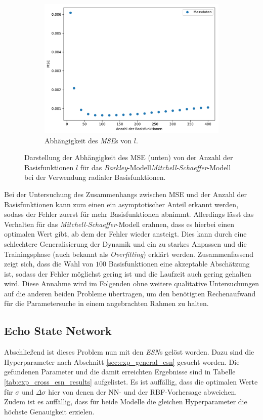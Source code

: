 \begin{figure}[h]
	\centering
	\begin{subfigure}{\textwidth}
		\centering
		\includegraphics[width=4.2in]{figures/results/cross_prediction/rbf_placements_uv_mse.pdf}
  		\caption{Abhängigkeit des \textit{MSE}s von $l$.}
	\end{subfigure}%
	
	\caption{Darstellung der Abhängigkeit des MSE (unten) von der Anzahl der Basisfunktionen $l$ für das \textit{Barkley}-Modell\textit{Mitchell-Schaeffer}-Modell bei der Verwendung radialer Basisfunktionen.}
	\label{fig:exp_cross_rbf_placements_mse_barkley}
\end{figure}

Bei der Untersuchung des Zusammenhangs zwischen MSE und der Anzahl der Basisfunktionen kann zum einen ein asymptotischer Anteil erkannt werden, sodass der Fehler zuerst für mehr Basisfunktionen abnimmt. Allerdings lässt das Verhalten für das \textit{Mitchell-Schaeffer}-Modell erahnen, dass es hierbei einen optimalen Wert gibt, ab dem der Fehler wieder ansteigt. Dies kann durch eine schlechtere Generalisierung der Dynamik und ein zu starkes Anpassen und die Trainingsphase (auch bekannt als \textit{Overfitting}) erklärt werden. Zusammenfassend zeigt sich, dass die Wahl von $100$ Basisfunktionen eine akzeptable Abschätzung ist, sodass der Fehler möglichst gering ist und die Laufzeit auch gering gehalten wird. Diese Annahme wird im Folgenden ohne weitere qualitative Untersuchungen auf die anderen beiden Probleme übertragen, um den benötigten Rechenaufwand für die Parametersuche in einem angebrachten Rahmen zu halten.  

\FloatBarrier
\subsection{Echo State Network}
Abschließend ist dieses Problem nun mit den \textit{ESN}s gelöst worden. Dazu sind die Hyperparameter nach Abschnitt \ref{sec:exp_general_esn} gesucht worden. Die gefundenen Parameter und die damit erreichten Ergebnisse sind in Tabelle \ref{tab:exp_cross_esn_results} aufgelistet. Es ist auffällig, dass die optimalen Werte für $\sigma$ und $\Delta \sigma$ hier von denen der NN- und der RBF-Vorhersage abweichen. Zudem ist es auffällig, dass für beide Modelle die gleichen Hyperparameter die höchste Genauigkeit erzielen. \\

